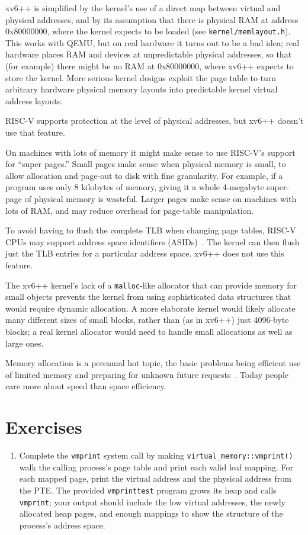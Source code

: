 xv6++ is simplified by the kernel's use of a direct map between virtual and
physical addresses, and by its assumption that there is physical RAM at
address 0x80000000, where the kernel expects to be loaded (see
\texttt{kernel/memlayout.h}). This works with QEMU, but on real hardware it
turns out to be a bad idea; real hardware places RAM and devices at
unpredictable physical addresses, so that (for example) there might be no RAM
at 0x80000000, where xv6++ expects to store the kernel. More serious kernel
designs exploit the page table to turn arbitrary hardware physical memory
layouts into predictable kernel virtual address layouts.

RISC-V supports protection at the level of physical addresses, but xv6++ doesn't
use that feature.

On machines with lots of memory it might make sense to use RISC-V's support for
``super pages.'' Small pages make sense when physical memory is small, to allow
allocation and page-out to disk with fine granularity. For example, if a program
uses only 8 kilobytes of memory, giving it a whole 4-megabyte super-page of
physical memory is wasteful. Larger pages make sense on machines with lots of RAM,
and may reduce overhead for page-table manipulation.

To avoid having to flush the complete TLB when changing page tables, RISC-V CPUs
may support address space identifiers (ASIDs)~\cite{riscv:priv}. The kernel can
then flush just the TLB entries for a particular address space. xv6++ does not
use this feature.

The xv6++ kernel's lack of a \texttt{malloc}-like allocator that can provide
memory for small objects prevents the kernel from using sophisticated data
structures that would require dynamic allocation. A more elaborate kernel would
likely allocate many different sizes of small blocks, rather than (as in xv6++)
just 4096-byte blocks; a real kernel allocator would need to handle small
allocations as well as large ones.

Memory allocation is a perennial hot topic, the basic problems being efficient
use of limited memory and preparing for unknown future requests~\cite{knuth}.
Today people care more about speed than space efficiency.

\section{Exercises}

\begin{enumerate}

\item Complete the \texttt{vmprint} system call by making
\texttt{virtual\_memory::vmprint()} walk the calling process's page table
and print each valid leaf mapping. For each mapped page, print the
virtual address and the physical address from the PTE. The provided
\texttt{vmprinttest} program grows its heap and calls \texttt{vmprint};
your output should include the low virtual addresses, the newly allocated
heap pages, and enough mappings to show the structure of the process's
address space.

\end{enumerate}
